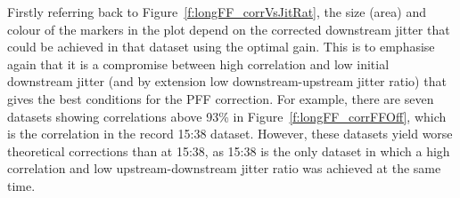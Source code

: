 Firstly referring back to Figure~\ref{f:longFF_corrVsJitRat}, the size (area) and colour of the markers in the plot depend on the corrected downstream jitter that could be achieved in that dataset using the optimal gain. This is to emphasise again that it is a compromise between high correlation and low initial downstream jitter (and by extension low downstream-upstream jitter ratio) that gives the best conditions for the PFF correction. For example, there are seven datasets showing correlations above 93\% in Figure~\ref{f:longFF_corrFFOff}, which is the correlation in the record 15:38 dataset. However, these datasets yield worse theoretical corrections than at 15:38, as 15:38 is the only dataset in which a high correlation and low upstream-downstream jitter ratio was achieved at the same time.

